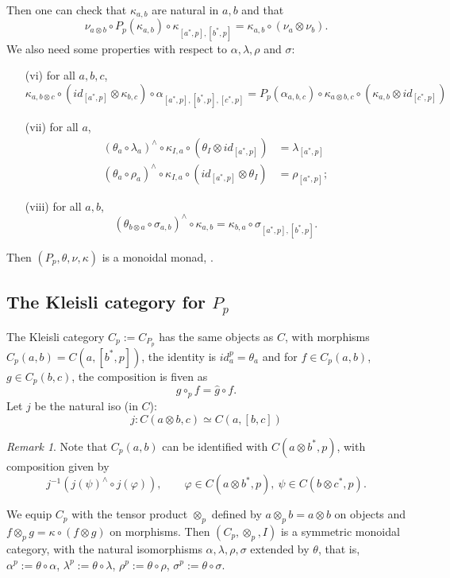 \documentclass[12pt]{article}
\theoremstyle{definition}
\theoremstyle{remark}
\newtheorem{remark}{Remark}
\begin{document}
Then one can check that $\kappa_{a,b}$ are natural in $a,b$ and that 
\[
\nu_{a\otimes b}\circ P_p(\kappa_{a,b})\circ
\kappa_{[a^*,p],[b^*,p]}=\kappa_{a,b}\circ(\nu_a\otimes \nu_b).
\]
We also need some properties with respect to $\alpha,\lambda,\rho$ and $\sigma$:
\begin{enumerate}
\item[(vi)] for all $a,b,c$,
\[
\kappa_{a,b\otimes c}\circ
(id_{[a^*,p]}\otimes\kappa_{b,c})\circ\alpha_{[a^*,p],[b^*,p],[c^*,p]}=P_p(\alpha_{a,b,c})\circ\kappa_{a\otimes
b,c}\circ(\kappa_{a,b}\otimes id_{[c^*,p]})
\]
\item[(vii)] for all $a$,
\begin{align*}
(\theta_a\circ \lambda_a)^\wedge\circ \kappa_{I,a}\circ (\theta_I\otimes
id_{[a^*,p]})&=\lambda_{[a^*,p]}\\
(\theta_a\circ \rho_a)^\wedge\circ \kappa_{I,a}\circ (id_{[a^*,p]}\otimes
\theta_I)&=\rho_{[a^*,p]};
\end{align*}

\item[(viii)] for all $a,b$,
\[
(\theta_{b\otimes a}\circ \sigma_{a,b})^\wedge\circ \kappa_{a,b}=\kappa_{b,a}\circ
\sigma_{[a^*,p],[b^*,p]}.
\]
\end{enumerate}
Then $(P_p,\theta,\nu,\kappa)$ is a monoidal monad, \cite{seal2013tensors}. 

\subsection{The Kleisli category for $P_p$}

The Kleisli category $C_p:=C_{P_p}$ has the same objects as $C$, with morphisms
$C_p(a,b)=C(a, [b^*,p])$, the identity is $id^p_a=\theta_a$ and for $f\in C_p(a,b)$, $g\in
C_p(b,c)$, the composition is fiven as 
\[
g\circ_p f= \hat g\circ f.
\]
Let $j$ be the natural iso (in $C$):
\[
j: C(a\otimes b,c)\simeq C(a,[b,c])
\]
\begin{remark}
Note that  $C_p(a,b)$ can be identified with $C(a\otimes b^*,p)$, with composition given by
\[
j^{-1}(j(\psi)^\wedge\circ j(\varphi)),\qquad \varphi\in C(a\otimes b^*,p),\ \psi\in
C(b\otimes c^*,p).
\]
\end{remark}

We equip $C_p$ with the tensor product  $\otimes_p$ defined by $a\otimes_p b=a\otimes
b$ on objects and $f\otimes_p g=\kappa\circ(f\otimes g)$ on morphisms. 
Then  $(C_p,\otimes_p,I)$ is a symmetric monoidal category, with  the natural isomorphisms
$\alpha,\lambda,\rho,\sigma$ extended by $\theta$, that is,
$\alpha^p:=\theta\circ \alpha$, $\lambda^p:=\theta\circ \lambda$, $\rho^p:=\theta\circ
\rho$, $\sigma^p:=\theta\circ \sigma$.


 
\end{document}
